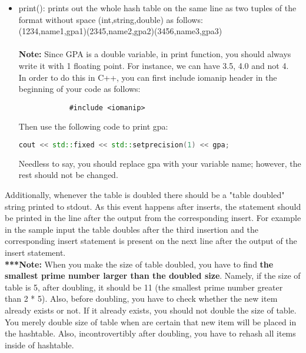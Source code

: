 \documentclass[times, 12pt]{article}
\begin{document}
\begin{itemize}
\begin{itemize}
        \item print(): prints out the whole hash table on the same line as two tuples of the format without space (int,string,double) as follows:\\
        (1234,name1,gpa1)(2345,name2,gpa2)(3456,name3,gpa3)\\\\
        \textbf{Note:} Since GPA is a double variable, in print function, you should always write it with 1 floating point. For instance, we can have 3.5, 4.0 and not 4.\\
        In order to do this in C++, you can first include iomanip header in the beginning of your code as follows:
        \begin{lstlisting}
            #include <iomanip>
        \end{lstlisting}
        
        Then use the following code to print gpa:
        
        \begin{lstlisting}[language=C++,
            directivestyle={\color{black}}
            emph={int,char,double,float,unsigned},
            emphstyle={\color{green}}
            ]
            cout << std::fixed << std::setprecision(1) << gpa;
        \end{lstlisting}
            
        Needless to say, you should replace gpa with your variable name; however, the rest should not be changed.
    \end{itemize}
\end{itemize}

Additionally, whenever the table is doubled there should be a "table doubled" string printed to stdout. As
this event happens after inserts, the statement should be printed in the line after the output from
the corresponding insert. For example in the sample input the table doubles after the third
insertion and the corresponding insert statement is present on the next line after the output of the insert statement.\\

\textbf{***Note:} When you make the size of table doubled, you have to find \textbf{the smallest prime number larger than the doubled size}. Namely, if the size of table is 5, after doubling, it should be 11 (the smallest prime number greater than 2 * 5). Also, before doubling, you have to check whether the new item already exists or not. If it already exists, you should not double the size of table. You merely double size of table when are certain that new item will be placed in the hashtable. Also, incontrovertibly after doubling, you have to rehash all items inside of hashtable.
\end{document}
